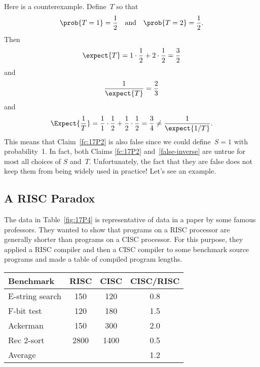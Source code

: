 \begin{editingnotes}
Here is a counterexample.  Define~$T$ so that
\begin{equation*}
    \prob{T = 1} = \frac{1}{2} \quad\text{and}\quad
    \prob{T = 2} = \frac{1}{2}.
\end{equation*}
Then
\begin{equation*}
    \expect{T} = 1 \cdot \frac{1}{2} + 2 \cdot \frac{1}{2} =
    \frac{3}{2}
\end{equation*}
and
\begin{equation*}
    \frac{1}{\expect{T}} = \frac{2}{3}
\end{equation*}
and
\begin{equation*}
\Expect{\frac{1}{T}}
    = \frac{1}{1} \cdot \frac{1}{2} + \frac{1}{2} \cdot \frac{1}{2}
    = \frac{3}{4} 
    \ne \frac{1}{\expect{1/T}}.
\end{equation*}
This means that Claim~\ref{fc:17P2} is also false since we could
define~$S = 1$ with probability~1.  In fact, both Claims \ref{fc:17P2}
and~\ref{false-inverse} are untrue for most all choices of $S$
and~$T$.  Unfortunately, the fact that they are false does not keep
them from being widely used in practice!  Let's see an example.

\subsection{A RISC Paradox}

The data in Table~\ref{fig:17P4} is representative of data in a paper
by some famous professors.  They wanted to show that programs on a
RISC processor are generally shorter than programs on a CISC
processor.  For this purpose, they applied a RISC compiler and then a
CISC compiler to some benchmark source programs and made a table of
compiled program lengths.

\begin{table}

\begin{tabular}{lccc}
Benchmark        & RISC          & CISC          & CISC/RISC\\
\hline
E-string search  & 150           & 120           & 0.8 \\
F-bit test       & 120           & 180           & 1.5 \\
Ackerman         & 150           & 300           & 2.0 \\
Rec 2-sort       & 2800          & 1400          & 0.5 \\
\hline
Average          &               &               & 1.2
\end{tabular}


\end{table}
\end{editingnotes}
